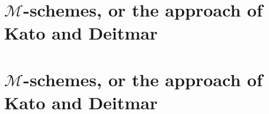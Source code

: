 \iftex
\section[M-schemes, or the approach of Kato and Deitmar]{$\mathcal{M}$-schemes, or the approach of Kato and Deitmar}
\fi
\ifblog
\section{$\mathcal{M}$-schemes, or the approach of Kato and Deitmar}
\fi

